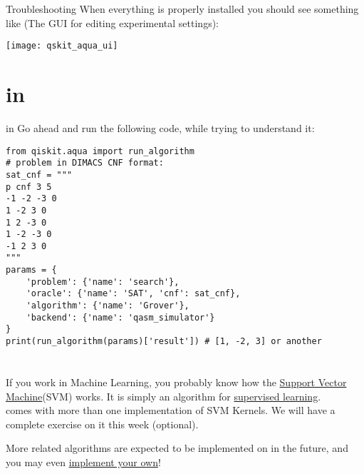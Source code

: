 \documentclass[aspectratio=43]{beamer}
\begin{document}
\begin{frame}{Troubleshooting \qka}
    \small{When everything is properly installed you should see something like (The \qka GUI for editing experimental settings):}
    \begin{center}
        \texttt{[image: qskit\_aqua\_ui]}
    \end{center}
\pagenumber
\end{frame}

\section{\gvsa in \qka}
\begin{frame}[fragile]{\gvsa in \qka}
Go ahead and run the following code, while trying to understand it:\begin{verbatim}
from qiskit.aqua import run_algorithm
# problem in DIMACS CNF format:
sat_cnf = """
p cnf 3 5
-1 -2 -3 0
1 -2 3 0
1 2 -3 0
1 -2 -3 0
-1 2 3 0
"""
params = {
    'problem': {'name': 'search'},
    'oracle': {'name': 'SAT', 'cnf': sat_cnf},
    'algorithm': {'name': 'Grover'},
    'backend': {'name': 'qasm_simulator'}
}
print(run_algorithm(params)['result']) # [1, -2, 3] or another
\end{verbatim}
\end{frame}



\section{\ai}
\begin{frame}{\ai}
\begin{card}
    If you work in Machine Learning, you probably know how the  \href{https://en.wikipedia.org/wiki/Support_vector_machine}{Support Vector Machine}(SVM) works. It is simply an algorithm for \href{https://en.wikipedia.org/wiki/Supervised_learning}{supervised learning}.\\
    \qka comes with more than one implementation of SVM Kernels. We will have a complete exercise on it this week (optional). 
\end{card}
\begin{card}
    More \ai related algorithms are expected to be implemented on \qka in the future, and you may even \href{https://qiskit.org/documentation/aqua/extending.html#algorithms}{implement your own}!
\end{card}
\pagenumber
\end{frame}
\end{document}
